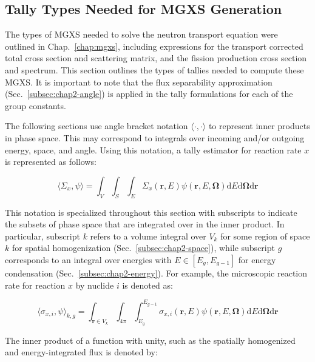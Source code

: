 \subsection{Tally Types Needed for \ac{MGXS} Generation}
\label{subsec:chap3-tally-types}

The types of \ac{MGXS} needed to solve the neutron transport equation were outlined in Chap.~\ref{chap:mgxs}, including expressions for the transport corrected total cross section and scattering matrix, and the fission production cross section and spectrum. This section outlines the types of tallies needed to compute these \ac{MGXS}. It is important to note that the flux separability approximation (Sec.~\ref{subsec:chap2-angle}) is applied in the tally formulations for each of the group constants.

The following sections use angle bracket notation $\langle \cdot , \cdot \rangle$ to represent inner products in phase space. This may correspond to integrals over incoming and/or outgoing energy, space, and angle. Using this notation, a tally estimator for reaction rate $x$ is represented as follows: 

\begin{equation}
\label{eqn:chap3-inner-prod-notation}
\langle \Sigma_x, \psi \rangle = \int_{V} \int_{S} \int_{E} \Sigma_{x}(\mathbf{r},E)\psi(\mathbf{r},E,\mathbf{\Omega}) \mathrm{d}E\mathrm{d}\mathbf{\Omega}\mathrm{d}\mathbf{r}
\end{equation}

\noindent This notation is specialized throughout this section with subscripts to indicate the subsets of phase space that are integrated over in the inner product. In particular, subscript $k$ refers to a volume integral over $V_{k}$ for some region of space $k$ for spatial homogenization (Sec.~\ref{subsec:chap2-space}), while subscript $g$ corresponds to an integral over energies with $E \in [E_{g}, E_{g-1}]$ for energy condensation (Sec.~\ref{subsec:chap2-energy}). For example, the microscopic reaction rate for reaction $x$ by nuclide $i$ is denoted as:

\begin{equation}
\label{eqn:chap3-angle-rxn-rate}
\langle \sigma_{x,i}, \psi \rangle_{k,g} = \int_{\mathbf{r} \in V_{k}} \int_{4\pi} \int_{E_{g}}^{E_{g-1}} \sigma_{x,i}(\mathbf{r},E)\psi(\mathbf{r},E,\mathbf{\Omega}) \mathrm{d}E\mathrm{d}\mathbf{\Omega}\mathrm{d}\mathbf{r}
\end{equation}

\noindent The inner product of a function with unity, such as the spatially homogenized and energy-integrated flux is denoted by:

